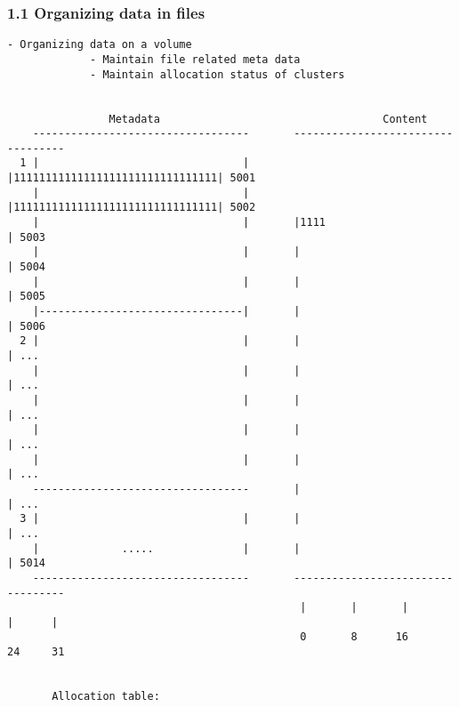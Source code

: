 \begin{frame}[fragile]
  \frametitle{1.1 Organizing data in files}
  \begin{lstlisting}[basicstyle=\tiny\ttfamily]
             - Organizing data on a volume
             - Maintain file related meta data
             - Maintain allocation status of clusters
                            

                Metadata                                   Content     
    ----------------------------------       ----------------------------------
  1 |                                |       |11111111111111111111111111111111| 5001
    |                                |       |11111111111111111111111111111111| 5002
    |                                |       |1111                            | 5003
    |                                |       |                                | 5004
    |                                |       |                                | 5005
    |--------------------------------|       |                                | 5006
  2 |                                |       |                                | ...
    |                                |       |                                | ...
    |                                |       |                                | ...
    |                                |       |                                | ...
    |                                |       |                                | ...
    ----------------------------------       |                                | ...
  3 |                                |       |                                | ...
    |             .....              |       |                                | 5014
    ----------------------------------       ----------------------------------
                                              |       |       |       |      |
                                              0       8      16      24     31


       Allocation table:
  \end{lstlisting}
\end{frame}



